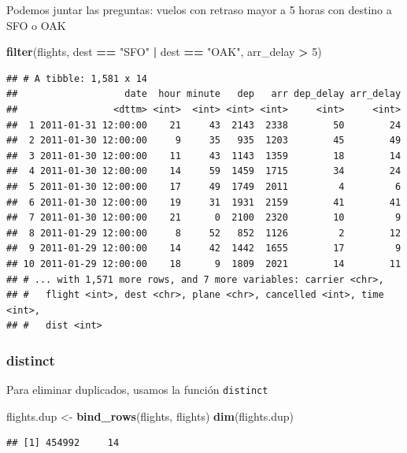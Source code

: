 \documentclass[]{article}
\newenvironment{Shaded}{\begin{snugshade}}{\end{snugshade}}
\newcommand{\KeywordTok}[1]{\textcolor[rgb]{0.13,0.29,0.53}{\textbf{#1}}}
\newcommand{\DecValTok}[1]{\textcolor[rgb]{0.00,0.00,0.81}{#1}}
\newcommand{\StringTok}[1]{\textcolor[rgb]{0.31,0.60,0.02}{#1}}
\newcommand{\OperatorTok}[1]{\textcolor[rgb]{0.81,0.36,0.00}{\textbf{#1}}}
\newcommand{\NormalTok}[1]{#1}
\begin{document}
Podemos juntar las preguntas: vuelos con retraso mayor a 5 horas con
destino a SFO o OAK

\begin{Shaded}
\begin{Highlighting}[]
\KeywordTok{filter}\NormalTok{(flights, dest }\OperatorTok{==}\StringTok{ "SFO"} \OperatorTok{|}\StringTok{ }\NormalTok{dest }\OperatorTok{==}\StringTok{ "OAK"}\NormalTok{, arr_delay }\OperatorTok{>}\StringTok{ }\DecValTok{5}\NormalTok{)}
\end{Highlighting}
\end{Shaded}

\begin{verbatim}
## # A tibble: 1,581 x 14
##                   date  hour minute   dep   arr dep_delay arr_delay
##                 <dttm> <int>  <int> <int> <int>     <int>     <int>
##  1 2011-01-31 12:00:00    21     43  2143  2338        50        24
##  2 2011-01-30 12:00:00     9     35   935  1203        45        49
##  3 2011-01-30 12:00:00    11     43  1143  1359        18        14
##  4 2011-01-30 12:00:00    14     59  1459  1715        34        24
##  5 2011-01-30 12:00:00    17     49  1749  2011         4         6
##  6 2011-01-30 12:00:00    19     31  1931  2159        41        41
##  7 2011-01-30 12:00:00    21      0  2100  2320        10         9
##  8 2011-01-29 12:00:00     8     52   852  1126         2        12
##  9 2011-01-29 12:00:00    14     42  1442  1655        17         9
## 10 2011-01-29 12:00:00    18      9  1809  2021        14        11
## # ... with 1,571 more rows, and 7 more variables: carrier <chr>,
## #   flight <int>, dest <chr>, plane <chr>, cancelled <int>, time <int>,
## #   dist <int>
\end{verbatim}

\subsubsection{distinct}\label{distinct}

Para eliminar duplicados, usamos la función \texttt{distinct}

\begin{Shaded}
\begin{Highlighting}[]
\NormalTok{flights.dup <-}\StringTok{ }\KeywordTok{bind_rows}\NormalTok{(flights, flights)}
\KeywordTok{dim}\NormalTok{(flights.dup)}
\end{Highlighting}
\end{Shaded}

\begin{verbatim}
## [1] 454992     14
\end{verbatim}
\end{document}
